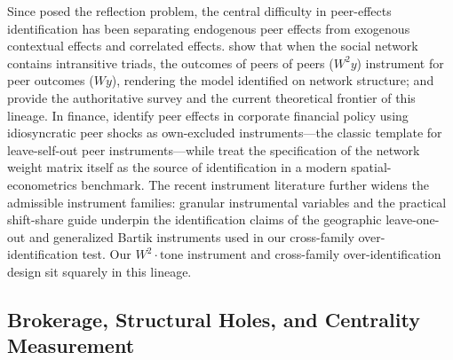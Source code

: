 Since \textcite{manski1993reflection} posed the reflection problem,
the central difficulty in peer-effects identification has been
separating endogenous peer effects from exogenous contextual effects
and correlated effects. \textcite{bramoulle2009identification} show
that when the social network contains intransitive triads, the
outcomes of peers of peers ($W^{2}y$) instrument for peer outcomes
($Wy$), rendering the model identified on network structure;
\textcite{bramoulle2020peer} and \textcite{boucher2024general}
provide the authoritative survey and the current theoretical
frontier of this lineage. In finance, \textcite{leary2014peer}
identify peer effects in corporate financial policy using
idiosyncratic peer shocks as own-excluded instruments---the classic
template for leave-self-out peer instruments---while
\textcite{grieser2022network} treat the specification of the network
weight matrix itself as the source of identification in a modern
spatial-econometrics benchmark. The recent instrument literature
further widens the admissible instrument families: granular
instrumental variables \parencite{gabaix2024granular} and the
practical shift-share guide \parencite{borusyak2025practical}
underpin the identification claims of the geographic leave-one-out
and generalized Bartik instruments used in our cross-family
over-identification test. Our $W^{2}\cdot\text{tone}$ instrument and
cross-family over-identification design sit squarely in this
lineage.

\subsection{Brokerage, Structural Holes, and Centrality Measurement}

